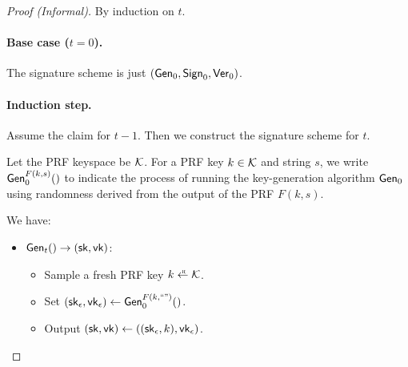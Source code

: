 \begin{proof}[Proof (Informal)]
By induction on $t$.

\paragraph{Base case ($t=0$).}
The signature scheme is just $(\mathsf{Gen}_0, \mathsf{Sign}_0, \mathsf{Ver}_0)$.

\paragraph{Induction step.}
Assume the claim for $t-1$.
Then we construct the signature scheme for $t$.

Let the PRF keyspace be $\mathcal{K}$.
For a PRF key $k \in \mathcal{K}$ and string $s$, we write $\mathsf{Gen}_0^{F(k, s)}()$
to indicate the process of running the key-generation algorithm
$\mathsf{Gen}_0$ using randomness derived from the output of the PRF $F(k, s)$.

We have:
\begin{framed}
\begin{itemize}
  \item $\mathsf{Gen}_t() \to ({\mathsf{sk}}, \mathsf{vk})$:
    \begin{itemize}
      \item Sample a fresh PRF key $k \getsr \calK$.
      \item Set $({\mathsf{sk}}_\epsilon, \mathsf{vk}_\epsilon) \gets \mathsf{Gen}_0^{F(k, \text{``''})}()$.
      \item Output $({\mathsf{sk}}, \mathsf{vk}) \gets (({\mathsf{sk}}_\epsilon, k), \mathsf{vk}_\epsilon)$.
    \end{itemize}


\end{itemize}
\end{framed}
\end{proof}
